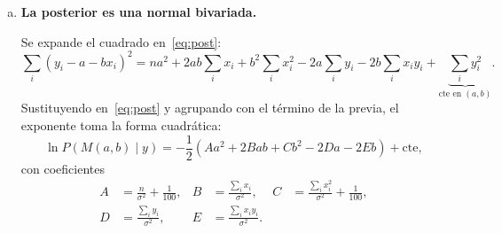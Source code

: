\documentclass[a4paper,11pt]{article}
\theoremstyle{remark}
\begin{document}
\begin{enumerate}[a)]
Se toma el logaritmo de~\eqref{eq:post} y se igualan a cero las
derivadas parciales respecto de $a$ y $b$.
Las ecuaciones resultantes son \textbf{lineales} en $(\hat{a},\hat{b})$
y forman el sistema $\mathbf{M}\vec\theta = \vec Z$:
\begin{equation}
  \underbrace{\begin{bmatrix}
    n + \dfrac{\sigma^2}{100} & \displaystyle\sum_i x_i \\[8pt]
    \displaystyle\sum_i x_i   & \displaystyle\sum_i x_i^2
                                +\dfrac{\sigma^2}{100}
  \end{bmatrix}}_{\mathbf{M}}
  \underbrace{\begin{bmatrix}\hat{a}\\\hat{b}\end{bmatrix}}_{\vec\theta}
  =
  \underbrace{\begin{bmatrix}
    \displaystyle\sum_i y_i \\[4pt]
    \displaystyle\sum_i x_iy_i
  \end{bmatrix}}_{\vec Z}.
  \label{eq:sistema}
\end{equation}

Los términos $\sigma^2/100$ en la diagonal provienen de derivar el
término de la previa $-\tfrac{a^2+b^2}{200}$ e incorporan regularización
tipo \emph{ridge} con parámetro efectivo $\lambda = \sigma^2/100 = 0.0009$.

\begin{lstlisting}
sum_x  = x.sum();    sum_x2 = (x**2).sum()   # estadisticos suficientes
sum_y  = y.sum();    sum_xy = (x*y).sum()

M_mat = np.array([[n + sigma**2/100, sum_x ],
                   [sum_x,           sum_x2 + sigma**2/100]])  # matriz M
Z_vec = np.array([sum_y, sum_xy])                              # vector Z

a_map, b_map = np.linalg.solve(M_mat, Z_vec)   # resuelve M theta = Z
\end{lstlisting}

\item \textbf{La posterior es una normal bivariada.}

Se expande el cuadrado en~\eqref{eq:post}:
\[
  \sum_i(y_i-a-bx_i)^2
  = na^2 + 2ab\!\sum_i x_i + b^2\!\sum_i x_i^2
    - 2a\!\sum_i y_i - 2b\!\sum_i x_iy_i
    + \underbrace{\sum_i y_i^2}_{\text{cte en }(a,b)}.
\]
Sustituyendo en~\eqref{eq:post} y agrupando con el término de la previa,
el exponente toma la forma cuadrática:
\begin{equation}
  \ln P(M(a,b)\mid y)
  = -\frac{1}{2}\!\left(Aa^2 + 2Bab + Cb^2 - 2Da - 2Eb\right)
    + \mathrm{cte},
  \label{eq:forma-cuad}
\end{equation}
con coeficientes
\begin{align}
  A &= \frac{n}{\sigma^2}+\frac{1}{100}, &
  B &= \frac{\sum_i x_i}{\sigma^2}, &
  C &= \frac{\sum_i x_i^2}{\sigma^2}+\frac{1}{100},
  \label{eq:ABC}\\
  D &= \frac{\sum_i y_i}{\sigma^2}, &
  E &= \frac{\sum_i x_iy_i}{\sigma^2}.&&
  \label{eq:DE}
\end{align}


\end{enumerate}
\end{document}

